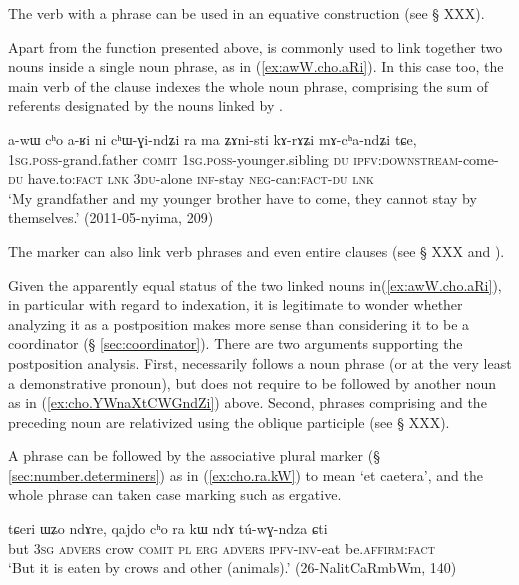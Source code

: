 The verb  with a  phrase can be used in an equative construction (see § XXX).

Apart from the function presented above,  is commonly used to link together two nouns inside a single noun phrase, as in (\ref{ex:awW.cho.aRi}). In this case too, the main verb of the clause indexes the whole noun phrase, comprising the sum of referents designated by the nouns linked by .

\begin{exe}
\ex \label{ex:awW.cho.aRi}
\gll a-wɯ cʰo a-ʁi ni cʰɯ-ɣi-ndʑi ra ma ʑɤni-sti kɤ-rɤʑi mɤ-cʰa-ndʑi tɕe, \\
\textsc{1sg}.\textsc{poss}-grand.father \textsc{comit} \textsc{1sg}.\textsc{poss}-younger.sibling \textsc{du} \textsc{ipfv}:\textsc{downstream}-come-\textsc{du} have.to:\textsc{fact} \textsc{lnk} \textsc{3du}-alone \textsc{inf}-stay \textsc{neg}-can:\textsc{fact}-\textsc{du} \textsc{lnk} \\ 
\glt `My grandfather and my younger brother have to come, they cannot stay by themselves.' (2011-05-nyima, 209)
\end{exe}

The marker  can also link verb phrases and even entire clauses (see § XXX and \citealt[313]{jacques14linking}).

Given the apparently equal status of the two linked nouns in(\ref{ex:awW.cho.aRi}), in particular with regard to indexation, it is legitimate to wonder whether analyzing it as a postposition makes more sense than considering it to be a coordinator (§ \ref{sec:coordinator}). There are two arguments supporting the postposition analysis. First,  necessarily follows a noun phrase (or at the very least a demonstrative pronoun), but does not require to be followed by another noun as in (\ref{ex:cho.YWnaXtCWGndZi}) above. Second, phrases comprising  and the preceding noun are relativized using the oblique participle (see § XXX).

A  phrase can be followed by the associative plural marker  (§ \ref{sec:number.determiners}) as in (\ref{ex:cho.ra.kW}) to mean `et caetera', and the whole phrase can taken case marking such as ergative.

\begin{exe}
\ex \label{ex:cho.ra.kW}
\gll tɕeri ɯʑo ndɤre, qajdo cʰo ra kɯ ndɤ tú-wɣ-ndza ɕti \\
but \textsc{3sg} \textsc{advers} crow \textsc{comit} \textsc{pl} \textsc{erg} \textsc{advers} \textsc{ipfv}-\textsc{inv}-eat be.\textsc{affirm}:\textsc{fact} \\
\glt `But it is eaten by crows and other (animals).' (26-NalitCaRmbWm, 140)
\end{exe}

